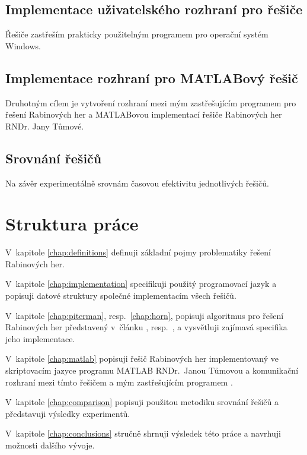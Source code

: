\subsection{Implementace uživatelského rozhraní pro řešiče}
Řešiče zastřeším prakticky použitelným programem pro operační systém Windows.
\subsection{Implementace rozhraní pro MATLABový řešič}
Druhotným cílem je vytvoření rozhraní mezi mým zastřešujícím programem pro řešení Rabinových her a MATLABovou implementací řešiče Rabinových her RNDr. Jany Tůmové.
\subsection{Srovnání řešičů}
Na závěr experimentálně srovnám časovou efektivitu jednotlivých řešičů.
\section{Struktura práce}
V~kapitole \ref{chap:definitions} definuji základní pojmy problematiky řešení Rabinových her.

V~kapitole \ref{chap:implementation} specifikuji použitý programovací jazyk a popisuji datové struktury společné implementacím všech řešičů.

V~kapitole \ref{chap:piterman}, resp.~\ref{chap:horn}, popisuji algoritmus pro řešení Rabinových her představený v~článku \cite{Piterman2006}, resp.~\cite{Horn2005}, a vysvětluji zajímavá specifika jeho implementace.

V~kapitole \ref{chap:matlab} popisuji řešič Rabinových her implementovaný ve skriptovacím jazyce programu MATLAB RNDr.~Janou Tůmovou a komunikační rozhraní mezi tímto řešičem a mým zastřešujícím programem \rgsexe.

V~kapitole \ref{chap:comparison} popisuji použitou metodiku srovnání řešičů a představuji výsledky experimentů.

V~kapitole \ref{chap:conclusions} stručně shrnuji výsledek této práce a navrhuji možnosti dalšího vývoje.
